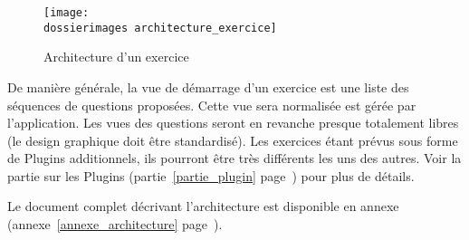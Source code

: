 \begin{figure}[htp]
	\centering
	\texttt{[image: \\dossierimages architecture\_exercice]}
	\caption{Architecture d'un exercice}
	\label{architecture_exercice}
\end{figure}

De manière générale, la vue de démarrage d’un exercice est une liste des séquences de questions proposées. Cette vue sera normalisée est gérée par l'application. Les vues des questions seront en revanche presque totalement libres (le design graphique doit être standardisé). Les exercices étant prévus sous forme de \og{}Plugins\fg{} additionnels, ils pourront \^{e}tre très différents les uns des autres. Voir la partie sur les Plugins (partie~\ref{partie_plugin} page~\pageref{partie_plugin}) pour plus de détails.

Le document complet décrivant l'architecture est disponible en annexe (annexe~\ref{annexe_architecture} page~\pageref{annexe_architecture}).
